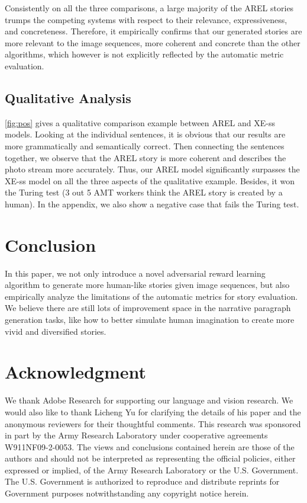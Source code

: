 \documentclass[11pt,a4paper]{article}
\begin{document}
Consistently on all the three comparisons, a large majority of the AREL stories trumps the competing systems with respect to their relevance, expressiveness, and concreteness. Therefore, it empirically confirms that our generated stories are more relevant to the image sequences, more coherent and concrete than the other algorithms, which however is not explicitly reflected by the automatic metric evaluation.

\subsection{Qualitative Analysis}
\autoref{fig:pos} gives a qualitative comparison example between AREL and XE-ss models. Looking at the individual sentences, it is obvious that our results are more grammatically and semantically correct. Then connecting the sentences together, we observe that the AREL story is more coherent and describes the photo stream more accurately. Thus, our AREL model significantly surpasses the XE-ss model on all the three aspects of the qualitative example. Besides, it won the Turing test (3 out 5 AMT workers think the AREL story is created by a human). 
In the appendix, we also show a negative case that fails the Turing test. 

\section{Conclusion}
In this paper, we not only introduce a novel adversarial reward learning algorithm to generate more human-like stories given image sequences, but also empirically analyze the limitations of the automatic metrics for story evaluation. We believe there are still lots of improvement space in the narrative paragraph generation tasks, like how to better simulate human imagination to create more vivid and diversified stories.

\section*{Acknowledgment}
We thank Adobe Research for supporting our language and vision research. We would also like to thank Licheng Yu for clarifying the details of his paper and the anonymous reviewers for their thoughtful comments. This research was sponsored in part by the Army Research Laboratory under cooperative agreements W911NF09-2-0053. The views and conclusions contained herein are those of the authors and should not be interpreted as representing the official policies, either expressed or implied, of the Army Research Laboratory or the U.S. Government. The U.S. Government is authorized to reproduce and distribute reprints for Government purposes notwithstanding any copyright notice herein.
\end{document}
